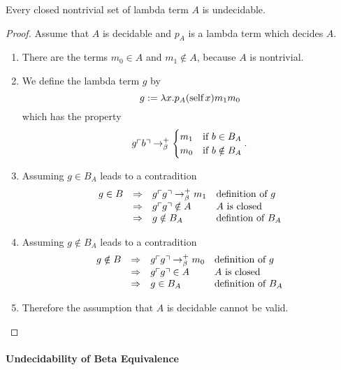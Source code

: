 \begin{theorem}
  Every closed nontrivial set of lambda term $A$ is undecidable.
  \begin{proof}
    Assume that $A$ is decidable and $p_A$ is a lambda term which decides $A$.
    \begin{enumerate}

    \item
      There are the terms $m_0 \in A$ and $m_1 \notin A$, because $A$ is
      nontrivial.

    \item
      We define the lambda term $g$ by
      $$ g := \lambda x. p_A (\text{self}\, x) m_1 m_0$$
      which has the property
      $$ g \ulcorner b \urcorner \to^+_\beta
      \begin{cases}
        m_1 & \text{if } b \in B_A \\
        m_0 & \text{if } b \notin B_A \\
      \end{cases}.
      $$

    \item
      Assuming $g \in B_A$ leads to a contradition
      $$
      \begin{array}{llll}
        g \in B
        & \Rightarrow & g \ulcorner g \urcorner \to^+_\beta m_1 & \text{definition of } g\\
        & \Rightarrow & g \ulcorner g \urcorner \notin A  & A \text{ is closed} \\
        & \Rightarrow & g \notin B_A & \text{defintion of }B_A
      \end{array}
      $$

    \item
      Assuming $g \notin B_A$ leads to a contradition
      $$
      \begin{array}{llll}
        g \notin B
        & \Rightarrow & g \ulcorner g \urcorner \to^+_\beta m_0 & \text{definition of } g\\
        & \Rightarrow & g \ulcorner g \urcorner \in A  & A \text{ is closed} \\
        & \Rightarrow & g \in B_A & \text{definition of }B_A
      \end{array}
      $$

    \item
      Therefore the assumption that $A$ is decidable cannot be valid.
    \end{enumerate}
  \end{proof}
\end{theorem}


\paragraph{Undecidability of Beta Equivalence}

